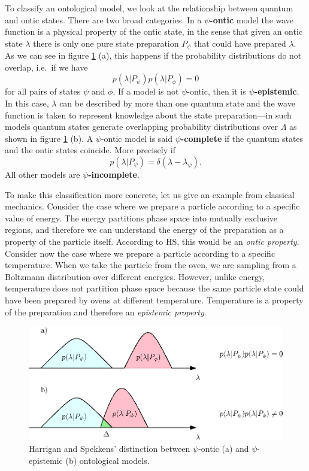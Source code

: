 \documentclass[10pt,twocolumn, nofootinbib]{revtex4-2}
\begin{document}
To classify an ontological model, we look at the relationship between quantum and ontic states. There are two broad categories. In a \textbf{$\psi$-ontic} model the wave function is a physical property of the ontic state, in the sense that given an ontic state $\lambda$ there is only one pure state preparation $P_\psi$ that could have prepared $\lambda$. As we can see in figure \ref{overlap} (a), this happens if the probability distributions do not overlap, i.e.\ if we have
\begin{equation}\label{ontic_condition}
	p(\lambda | P_{\psi})p(\lambda|P_{\phi})=0
\end{equation}
for all pairs of states $\psi$ and $\phi$. If a model is not $\psi$-ontic, then it is \textbf{$\psi$-epistemic}. In this case, $\lambda$ can be described by more than one quantum state and the wave function is taken to represent knowledge about the state preparation---in such models quantum states generate overlapping probability distributions over $\Lambda$ as shown in figure \ref{overlap} (b). A $\psi$-ontic model is said \textbf{$\psi$-complete} if the quantum states and the ontic states coincide. More precisely if 
\begin{equation}\label{complete_condition}
	p(\lambda|P_\psi)=\delta(\lambda-\lambda_{\psi}).
\end{equation}
All other models are \textbf{$\psi$-incomplete}.

To make this classification more concrete, let us give an example from classical mechanics. Consider the case where we prepare a particle according to a specific value of energy. The energy partitions phase space into mutually exclusive regions, and therefore we can understand the energy of the preparation as a property of the particle itself. According to HS, this would be an \emph{ontic property}. Consider now the case where we prepare a particle according to a specific temperature. When we take the particle from the oven, we are sampling from a Boltzmann distribution over different energies. However, unlike energy, temperature does not partition phase space because the same particle state could have been prepared by ovens at different temperature. Temperature is a property of the preparation and therefore an \emph{epistemic property}. 

\begin{figure}
\includegraphics[scale=.7]{ontic}
\caption{\footnotesize{Harrigan and Spekkens' distinction between $\psi$-ontic (a) and $\psi$-epistemic (b) ontological models.}}\label{overlap}
\end{figure}
\end{document}
